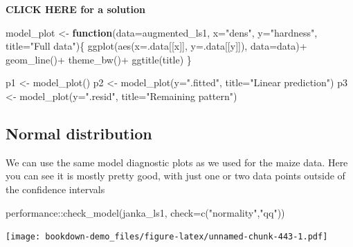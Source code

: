 \documentclass[
]{book}
\newenvironment{Shaded}{\begin{snugshade}}{\end{snugshade}}
\newcommand{\AttributeTok}[1]{\textcolor[rgb]{0.77,0.63,0.00}{#1}}
\newcommand{\ControlFlowTok}[1]{\textcolor[rgb]{0.13,0.29,0.53}{\textbf{#1}}}
\newcommand{\FunctionTok}[1]{\textcolor[rgb]{0.00,0.00,0.00}{#1}}
\newcommand{\NormalTok}[1]{#1}
\newcommand{\OtherTok}[1]{\textcolor[rgb]{0.56,0.35,0.01}{#1}}
\newcommand{\SpecialCharTok}[1]{\textcolor[rgb]{0.00,0.00,0.00}{#1}}
\newcommand{\StringTok}[1]{\textcolor[rgb]{0.31,0.60,0.02}{#1}}
\begin{document}
\textbf{CLICK HERE for a solution}

\begin{Shaded}
\begin{Highlighting}[]
\NormalTok{model\_plot }\OtherTok{\textless{}{-}} \ControlFlowTok{function}\NormalTok{(}\AttributeTok{data=}\NormalTok{augmented\_ls1, }\AttributeTok{x=}\StringTok{"dens"}\NormalTok{, }\AttributeTok{y=}\StringTok{"hardness"}\NormalTok{, }\AttributeTok{title=}\StringTok{"Full data"}\NormalTok{)\{}
  \FunctionTok{ggplot}\NormalTok{(}\FunctionTok{aes}\NormalTok{(}\AttributeTok{x=}\NormalTok{.data[[x]], }\AttributeTok{y=}\NormalTok{.data[[y]]), }\AttributeTok{data=}\NormalTok{data)}\SpecialCharTok{+}
  \FunctionTok{geom\_line}\NormalTok{()}\SpecialCharTok{+}
    \FunctionTok{theme\_bw}\NormalTok{()}\SpecialCharTok{+}
      \FunctionTok{ggtitle}\NormalTok{(title)}
\NormalTok{\}}

\NormalTok{p1 }\OtherTok{\textless{}{-}} \FunctionTok{model\_plot}\NormalTok{()}
\NormalTok{p2 }\OtherTok{\textless{}{-}} \FunctionTok{model\_plot}\NormalTok{(}\AttributeTok{y=}\StringTok{".fitted"}\NormalTok{, }\AttributeTok{title=}\StringTok{"Linear prediction"}\NormalTok{)}
\NormalTok{p3 }\OtherTok{\textless{}{-}} \FunctionTok{model\_plot}\NormalTok{(}\AttributeTok{y=}\StringTok{".resid"}\NormalTok{, }\AttributeTok{title=}\StringTok{"Remaining pattern"}\NormalTok{)}
\end{Highlighting}
\end{Shaded}

\hypertarget{normal-distribution-2}{%
\subsection{Normal distribution}\label{normal-distribution-2}}

We can use the same model diagnostic plots as we used for the maize data.
Here you can see it is mostly pretty good, with just one or two data points outside of the confidence intervals

\begin{Shaded}
\begin{Highlighting}[]
\NormalTok{performance}\SpecialCharTok{::}\FunctionTok{check\_model}\NormalTok{(janka\_ls1, }\AttributeTok{check=}\FunctionTok{c}\NormalTok{(}\StringTok{"normality"}\NormalTok{,}\StringTok{"qq"}\NormalTok{))}
\end{Highlighting}
\end{Shaded}

\texttt{[image: bookdown-demo\_files/figure-latex/unnamed-chunk-443-1.pdf]}
\end{document}
